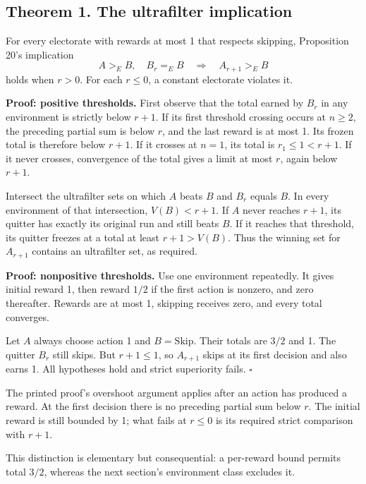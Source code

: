 \documentclass[
  11pt,
  letterpaper,
]{article}
\begin{document}
\subsection{Theorem 1. The ultrafilter
implication}\label{theorem-1.-the-ultrafilter-implication}

For every electorate with rewards at most 1 that respects skipping,
Proposition 20's implication \[
 A>_E B,\quad B_r=_E B
                  \quad\Longrightarrow\quad A_{r+1}>_E B
\] holds when \(r>0\). For each \(r\leq0\), a constant electorate
violates it.

\textbf{Proof: positive thresholds.} First observe that the total earned
by \(B_r\) in any environment is strictly below \(r+1\). If its first
threshold crossing occurs at \(n\geq2\), the preceding partial sum is
below \(r\), and the last reward is at most 1. Its frozen total is
therefore below \(r+1\). If it crosses at \(n=1\), its total is
\(r_1\leq1<r+1\). If it never crosses, convergence of the total gives a
limit at most \(r\), again below \(r+1\).

Intersect the ultrafilter sets on which \(A\) beats \(B\) and \(B_r\)
equals \(B\). In every environment of that intersection, \(V(B)<r+1\).
If \(A\) never reaches \(r+1\), its quitter has exactly its original run
and still beats \(B\). If it reaches that threshold, its quitter freezes
at a total at least \(r+1>V(B)\). Thus the winning set for \(A_{r+1}\)
contains an ultrafilter set, as required.

\textbf{Proof: nonpositive thresholds.} Use one environment repeatedly.
It gives initial reward 1, then reward \(1/2\) if the first action is
nonzero, and zero thereafter. Rewards are at most 1, skipping receives
zero, and every total converges.

Let \(A\) always choose action 1 and \(B=\mathrm{Skip}\). Their totals
are \(3/2\) and 1. The quitter \(B_r\) still skips. But \(r+1\leq1\), so
\(A_{r+1}\) skips at its first decision and also earns 1. All hypotheses
hold and strict superiority fails. \hfill\(\square\)

The printed proof's overshoot argument applies after an action has
produced a reward. At the first decision there is no preceding partial
sum below \(r\). The initial reward is still bounded by 1; what fails at
\(r\leq0\) is its required strict comparison with \(r+1\).

This distinction is elementary but consequential: a per-reward bound
permits total \(3/2\), whereas the next section's environment class
excludes it.
\end{document}
